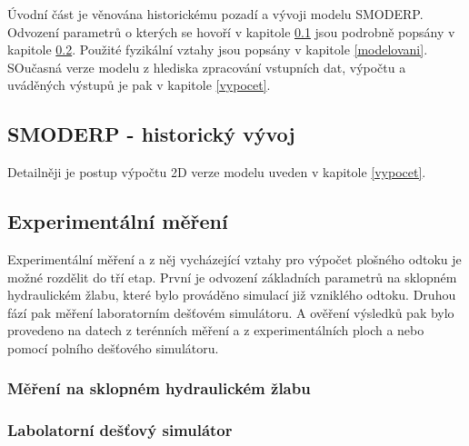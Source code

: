 %

Úvodní část je věnována historickému pozadí a vývoji modelu SMODERP. Odvození parametrů o kterých se hovoří v kapitole \ref{SM_hist} jsou podrobně popsány v kapitole \ref{Exp_mer}. Použité fyzikální vztahy jsou popsány v kapitole \ref{modelovani}. SOučasná verze modelu z hlediska zpracování vstupních dat, výpočtu a uváděných výstupů je pak v kapitole \ref{vypocet}.





\subsection{SMODERP - historický vývoj} \label{SM_hist}

Detailněji je postup výpočtu 2D verze modelu uveden v kapitole \ref{vypocet}.

\subsection{Experimentální měření} \label{Exp_mer}
Experimentální měření a z něj vycházející vztahy pro výpočet plošného odtoku je možné rozdělit do tří etap. První je odvození základních parametrů na sklopném hydraulickém žlabu, které bylo prováděno simulací již vzniklého odtoku. Druhou fází pak měření laboratorním dešťovém simulátoru. A ověření výsledků pak bylo provedeno na datech z terénních měření a z experimentálních ploch a nebo pomocí polního dešťového simulátoru.

	\subsubsection{Měření na sklopném hydraulickém žlabu} \label{Exp_mer_zlab}
	


	\subsubsection{Labolatorní dešťový simulátor} \label{Exp_ mer_labDS}
	


%	

%		


